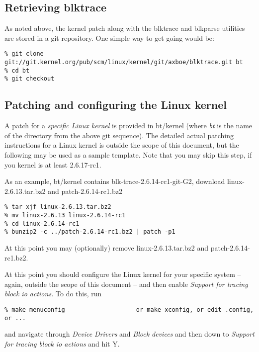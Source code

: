 \documentclass{article}
\begin{document}
\subsection{\label{sec:get-blktrace}Retrieving blktrace}

As noted above, the kernel patch along with the blktrace and blkparse utilities are stored in a git repository. One simple way to get going would be:

\begin{verbatim}
% git clone git://git.kernel.org/pub/scm/linux/kernel/git/axboe/blktrace.git bt
% cd bt
% git checkout
\end{verbatim}

\subsection{\label{sec:patching}Patching and configuring the Linux kernel}

A patch for a \emph{specific Linux kernel} is provided in bt/kernel (where
\emph{bt} is the name of the directory from the above git sequence). The
detailed actual patching instructions for a Linux kernel is outside the
scope of this document, but the following may be used as a sample template.
Note that you may skip this step, if you kernel is at least 2.6.17-rc1.

As an example, bt/kernel contains blk-trace-2.6.14-rc1-git-G2, download
linux-2.6.13.tar.bz2 and patch-2.6.14-rc1.bz2

\begin{verbatim}
% tar xjf linux-2.6.13.tar.bz2 
% mv linux-2.6.13 linux-2.6.14-rc1
% cd linux-2.6.14-rc1
% bunzip2 -c ../patch-2.6.14-rc1.bz2 | patch -p1
\end{verbatim}

At this point you may (optionally) remove linux-2.6.13.tar.bz2 and
patch-2.6.14-rc1.bz2.

At this point you should configure the Linux kernel for your specific
system -- again, outside the scope of this document -- and then enable
\emph{Support for tracing block io actions.} To do this, run

\begin{verbatim}
% make menuconfig                    or make xconfig, or edit .config, or ...
\end{verbatim}

and navigate through \emph{Device Drivers} and \emph{Block devices}
and then down to \emph{Support for tracing block io actions} and hit Y.
\end{document}
